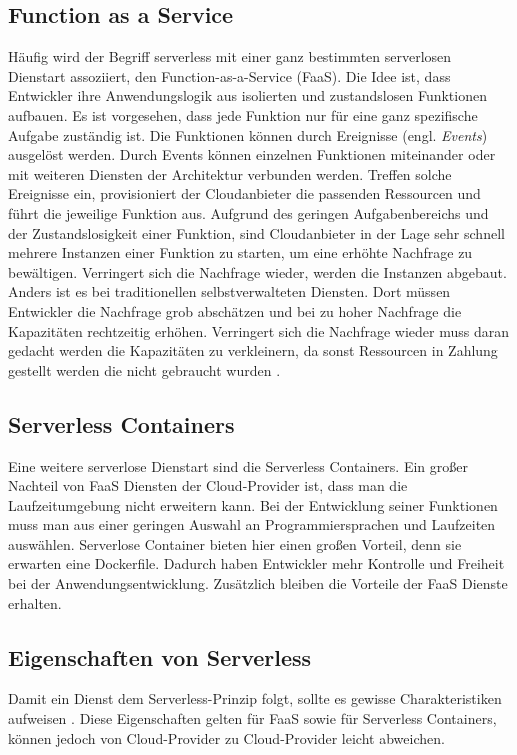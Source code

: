 \subsection{Function as a Service}
Häufig wird der Begriff serverless mit einer ganz bestimmten serverlosen Dienstart
assoziiert, den Function-as-a-Service (FaaS).
Die Idee ist, dass Entwickler ihre Anwendungslogik aus isolierten und 
zustandslosen Funktionen aufbauen. Es ist vorgesehen, dass jede Funktion nur für eine
ganz spezifische Aufgabe zuständig ist. Die Funktionen können
durch Ereignisse (engl. \textit{Events}) ausgelöst werden.
Durch Events können einzelnen Funktionen miteinander oder mit
weiteren Diensten der Architektur verbunden werden. 
Treffen solche Ereignisse ein, provisioniert der
Cloudanbieter die passenden Ressourcen und führt die jeweilige Funktion aus.
Aufgrund des geringen Aufgabenbereichs und der Zustandslosigkeit einer Funktion,
sind Cloudanbieter in der Lage sehr schnell mehrere Instanzen einer Funktion zu starten,
um eine erhöhte Nachfrage zu bewältigen.
Verringert sich die Nachfrage wieder, werden die Instanzen abgebaut. Anders ist 
es bei traditionellen selbstverwalteten Diensten. Dort müssen Entwickler die Nachfrage grob
abschätzen und bei zu hoher Nachfrage die Kapazitäten rechtzeitig
erhöhen. Verringert sich die Nachfrage wieder muss daran
gedacht werden die Kapazitäten zu verkleinern, da sonst
Ressourcen in Zahlung gestellt werden die nicht gebraucht wurden
\cite{WhatIsServerless} \cite{ServerlessTrends}.

\subsection{Serverless Containers}
Eine weitere serverlose Dienstart sind die Serverless Containers.
Ein großer Nachteil von FaaS Diensten der Cloud-Provider ist,
dass man die Laufzeitumgebung nicht erweitern kann. Bei der
Entwicklung seiner Funktionen muss man aus einer geringen Auswahl
an Programmiersprachen und Laufzeiten auswählen. Serverlose Container
bieten hier einen großen Vorteil, denn sie erwarten eine Dockerfile.
Dadurch haben Entwickler mehr Kontrolle und Freiheit bei der
Anwendungsentwicklung. Zusätzlich bleiben die Vorteile der FaaS Dienste erhalten.

\subsection{Eigenschaften von Serverless}
Damit ein Dienst dem Serverless-Prinzip folgt, sollte es
gewisse Charakteristiken aufweisen \cite{ShafKhonMou}. Diese Eigenschaften gelten
für FaaS sowie für Serverless Containers, können jedoch von Cloud-Provider zu
Cloud-Provider leicht abweichen.

